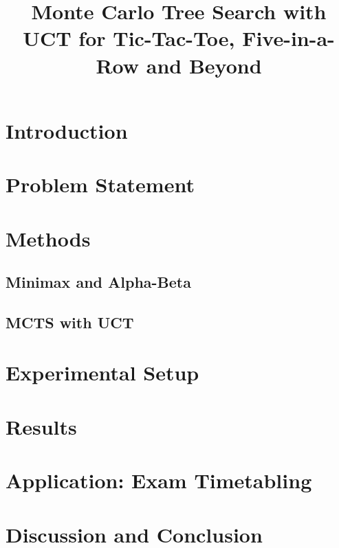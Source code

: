 \documentclass[conference]{IEEEtran}
\begin{document}
\title{Monte Carlo Tree Search with UCT for Tic-Tac-Toe, Five-in-a-Row and Beyond}
\author{
}
\maketitle

\begin{abstract}\end{abstract}

\section{Introduction}
\section{Problem Statement}
\section{Methods}
\subsection{Minimax and Alpha-Beta}
\subsection{MCTS with UCT}
\section{Experimental Setup}
\section{Results}
\section{Application: Exam Timetabling}
\section{Discussion and Conclusion}



\end{document}
